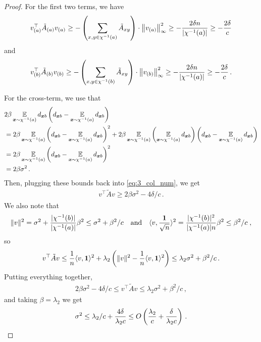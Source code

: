 \begin{proof}
    For the first two terms, we have 
    \[v_{(a)}^\top \tilde{A}_{(a)} v_{(a)} \geq - \left(\sum_{x, y \in \chi^{-1}(a)} \tilde{A}_{xy}\right) \cdot \left\lVert v_{(a)}\right\rVert^2_\infty \geq - \frac{2\delta n}{|\chi^{-1}(a)|} \geq - \frac{2\delta}{c}\]
    and 
    \[v_{(b)}^\top \tilde{A}_{(b)} v_{(b)} \geq - \left(\sum_{x, y \in \chi^{-1}(b)} \tilde{A}_{xy}\right) \cdot \left\lVert v_{(b)}\right\rVert^2_\infty \geq - \frac{2\delta n}{|\chi^{-1}(a)|} \geq - \frac{2\delta}{c}\,.\]

    For the cross-term, we use that
    \begin{align*}
    &2 \beta \operatorname*{\mathbb{E}}_{\bm{x} \sim \chi^{-1}(a)} d_{\bm{x}b} \left(d_{\bm{x}b}-\operatorname*{\mathbb{E}}_{\bm{x} \sim \chi^{-1}(a)} d_{\bm{x}b}\right)\\
    &= 2 \beta \operatorname*{\mathbb{E}}_{\bm{x} \sim \chi^{-1}(a)} \left(d_{\bm{x}b}-\operatorname*{\mathbb{E}}_{\bm{x} \sim \chi^{-1}(a)} d_{\bm{x}b}\right)^2 + 2 \beta \operatorname*{\mathbb{E}}_{\bm{x} \sim \chi^{-1}(a)} \left(\operatorname*{\mathbb{E}}_{\bm{x} \sim \chi^{-1}(a)} d_{\bm{x}b}\right) \left(d_{\bm{x}b}-\operatorname*{\mathbb{E}}_{\bm{x} \sim \chi^{-1}(a)} d_{\bm{x}b}\right)\\
    &= 2 \beta \operatorname*{\mathbb{E}}_{\bm{x} \sim \chi^{-1}(a)} \left(d_{\bm{x}b}-\operatorname*{\mathbb{E}}_{\bm{x} \sim \chi^{-1}(a)} d_{\bm{x}b}\right)^2\\
    &= 2\beta \sigma^2\,.
    \end{align*}
    Then, plugging these bounds back into \cref{eq:3_col_num}, we get 
    \begin{align*}
    v^\top \tilde{A}v
    \geq 2 \beta \sigma^2 - 4 \delta/c\,.
    \end{align*}
    We also note that \[\lVert v\rVert^2 = \sigma^2 + \frac{|\chi^{-1}(b)|}{|\chi^{-1}(a)|} \beta^2 \leq \sigma^2 + \beta^2/c\quad\text{and}\quad \langle v, \frac{\mathbf{1}}{\sqrt{n}}\rangle^2 = \frac{|\chi^{-1}(b)|^2}{|\chi^{-1}(a)| n}\beta^2 \leq \beta^2 / c\;,\] so
    \[v^\top \tilde{A} v \leq \frac{1}{n} \langle v, \mathbf{1}\rangle^2 + \lambda_2 \left(\lVert v\rVert^2 - \frac{1}{n} \langle v, \mathbf{1}\rangle^2\right) \leq \lambda_2 \sigma^2 + \beta^2/c\,.\]
    Putting everything together,
    \begin{align*}
        2 \beta \sigma^2 - 4 \delta/c \leq v^\top \tilde{A} v \leq \lambda_2 \sigma^2 + \beta^2/c\,,
    \end{align*}
    and taking $\beta=\lambda_2$ we get
    \[\sigma^2 \leq \lambda_2/c + \frac{4\delta }{\lambda_2c} \leq O\left(\frac{\lambda_2}{c} + \frac{\delta}{\lambda_2 c }\right)\,.\]
\end{proof}
